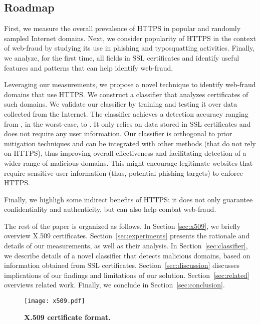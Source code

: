 \documentclass[twocolumn]{article}
\begin{document}
\subsection{Roadmap}
First, we measure the overall prevalence of HTTPS in popular and randomly 
sampled Internet domains. Next, we consider popularity of HTTPS 
in the context of web-fraud by studying its use in phishing and 
typosquatting activities. Finally, we analyze, for the first time, all fields in SSL 
certificates and  
identify useful features and patterns that can help identify web-fraud.

Leveraging our measurements, we propose a novel technique to identify web-fraud domains that use
HTTPS. We construct a classifier that analyzes certificates of such domains.
We validate our classifier by training and testing it over data 
collected from the Internet. The classifier achieves a detection 
accuracy ranging from , in the worst-case, to . It only relies on data stored in SSL certificates and does not require any user information.
Our classifier is orthogonal to prior mitigation techniques and can be integrated with other methods 
(that do not rely on HTTPS), thus improving overall effectiveness and facilitating detection of a wider range of malicious domains.
This might encourage legitimate websites that require sensitive user information (thus, potential 
phishing targets) to enforce HTTPS.

Finally, we highligh some indirect benefits of HTTPS: it does not 
only guarantee confidentiality and authenticity, but can also help combat web-fraud.




\vspace{0.3cm} The rest of the paper is organized as follows. In Section \ref{sec:x509}, we briefly overview
X.509 certificates. Section~\ref{sec:experiments} presents the rationale and details of our measurements, as well as their analysis. 
In Section~\ref{sec:classifier}, we describe details of a novel classifier that detects malicious 
domains, based on information obtained from SSL certificates.
Section~\ref{sec:discussion} discusses implications of our findings and limitations of our solution. Section~\ref{sec:related}
overviews related work. Finally, we conclude in Section~\ref{sec:conclusion}.




\begin{figure}[t]
  \centering
  \texttt{[image: x509.pdf]}
  \caption{\label{fig:x509format} {\small \bf X.509 certificate format.\vspace{-0.4cm}}}
\end{figure}
\end{document}
